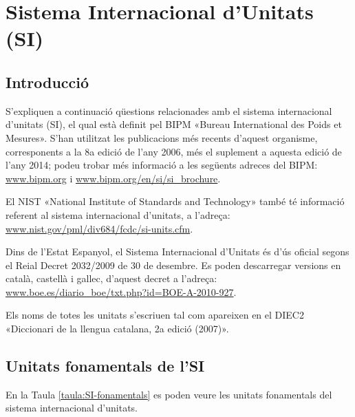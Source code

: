 \chapter{Sistema Internacional d'Unitats (SI)}\label{sec:SI}

\section{Introducció}
S'expliquen a continuació qüestions relacionades amb el sistema
internacional d'unitats (SI), el qual està definit pel BIPM «Bureau
International des Poids et Mesures». S'han utilitzat les publicacions més recents d'aquest organisme, corresponents a la 8a edició de l'any 2006, més el suplement a aquesta edició de l'any 2014; podeu trobar més informació a les següents adreces del BIPM: \href{http://www.bipm.org/}{www.bipm.org} i
\href{http://www.bipm.org/en/si/si_brochure/}{www.bipm.org/en/si/si\_brochure}.

El NIST «National Institute of Standards and Technology» també té informació referent al sistema
internacional d'unitats, a l'adreça: \href{http://www.nist.gov/pml/div684/fcdc/si-units.cfm}
{www.nist.gov/pml/div684/fcdc/si-units.cfm}.

Dins de l'Estat Espanyol, el Sistema Internacional d'Unitats és d'ús oficial segons el Reial Decret 2032/2009 de 30 de desembre. Es poden descarregar versions en català, castellà i gallec, d'aquest decret a l'adreça: \href{http://www.boe.es/diario_boe/txt.php?id=BOE-A-2010-927}
{www.boe.es/diario\_boe/txt.php?id=BOE-A-2010-927}.

Els noms de totes les unitats s'escriuen tal com apareixen en el DIEC2 «Diccionari de la llengua catalana, 2a edició (2007)».

\section{Unitats fonamentals de l'SI}

En la Taula \vref{taula:SI-fonamentals} es poden veure les unitats
fonamentals del sistema internacional d'unitats.

